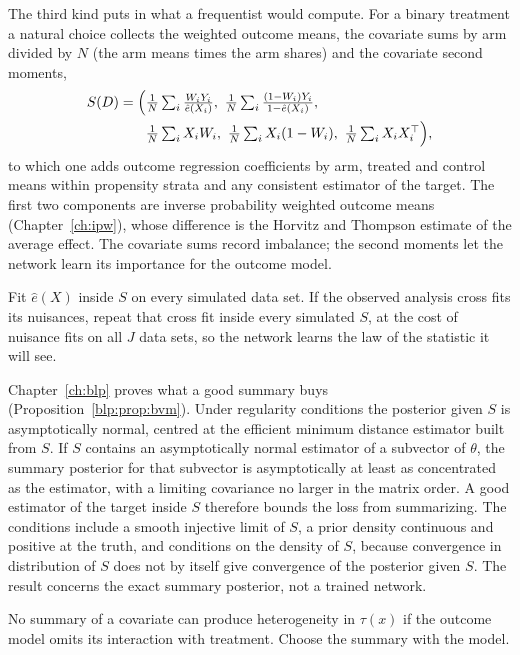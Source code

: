 The third kind puts in what a frequentist would compute. For a binary treatment a natural choice collects the weighted outcome means, the covariate sums by arm divided by $N$ (the arm means times the arm shares) and the covariate second moments,
\[
\begin{split}
S(D) = \Bigl(&\tfrac1N\textstyle\sum_i \tfrac{W_iY_i}{\hat e(X_i)},\ \tfrac1N\sum_i\tfrac{(1-W_i)Y_i}{1-\hat e(X_i)},\\
&\tfrac1N\textstyle\sum_i X_iW_i,\ \tfrac1N\sum_i X_i(1-W_i),\ \tfrac1N\sum_i X_iX_i^\top\Bigr),
\end{split}
\]
to which one adds outcome regression coefficients by arm, treated and control means within propensity strata and any consistent estimator of the target. The first two components are inverse probability weighted outcome means (Chapter~\ref{ch:ipw}), whose difference is the Horvitz and Thompson estimate of the average effect. The covariate sums record imbalance; the second moments let the network learn its importance for the outcome model.

Fit $\hat e(X)$ inside $S$ on every simulated data set. If the observed analysis cross fits its nuisances, repeat that cross fit inside every simulated $S$, at the cost of nuisance fits on all $J$ data sets, so the network learns the law of the statistic it will see.

Chapter~\ref{ch:blp} proves what a good summary buys (Proposition~\ref{blp:prop:bvm}). Under regularity conditions the posterior given $S$ is asymptotically normal, centred at the efficient minimum distance estimator built from $S$. If $S$ contains an asymptotically normal estimator of a subvector of $\theta$, the summary posterior for that subvector is asymptotically at least as concentrated as the estimator, with a limiting covariance no larger in the matrix order. A good estimator of the target inside $S$ therefore bounds the loss from summarizing. The conditions include a smooth injective limit of $S$, a prior density continuous and positive at the truth, and conditions on the density of $S$, because convergence in distribution of $S$ does not by itself give convergence of the posterior given $S$. The result concerns the exact summary posterior, not a trained network.

No summary of a covariate can produce heterogeneity in $\tau(x)$ if the outcome model omits its interaction with treatment. Choose the summary with the model.

